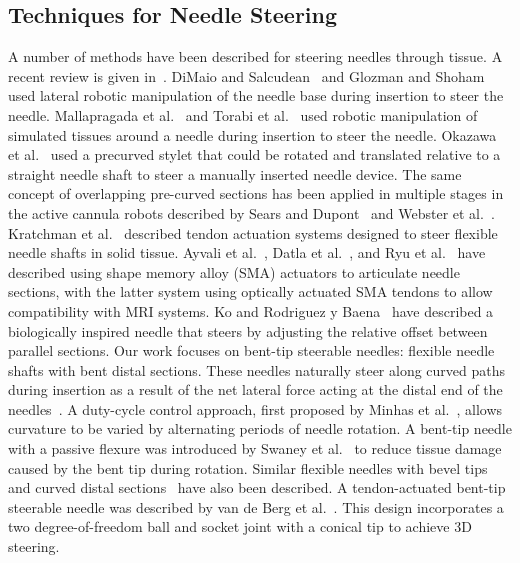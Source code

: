 \subsection{Techniques for Needle Steering}
A number of methods have been described for steering needles through tissue. A recent review is given in~\cite{vandeBerg2014}. DiMaio and Salcudean~\cite{DiMaio2005} and Glozman and Shoham~\cite{Glozman2007} used lateral robotic manipulation of the needle base during insertion to steer the needle. Mallapragada et al.~\cite{Mallapragada2009} and Torabi et al.~\cite{Torabi2009} used robotic manipulation of simulated tissues around a needle during insertion to steer the needle. Okazawa et al.~\cite{Okazawa2005} used a precurved stylet that could be rotated and translated relative to a straight needle shaft to steer a manually inserted needle device. The same concept of overlapping pre-curved sections has been applied in multiple stages in the active cannula robots described by Sears and Dupont~\cite{Sears2006} and Webster et al.~\cite{Webster2009}. Kratchman et al.~\cite{Kratchman2011} described tendon actuation systems designed to steer flexible needle shafts in solid tissue. Ayvali et al.~\cite{Ayvali2012}, Datla et al.~\cite{Datla2014}, and Ryu et al.~\cite{Ryu2014} have described using shape memory alloy (SMA) actuators to articulate needle sections, with the latter system using optically actuated SMA tendons to allow compatibility with MRI systems. Ko and Rodriguez y Baena~\cite{Ko2013} have described a biologically inspired needle that steers by adjusting the relative offset between parallel sections. Our work focuses on bent-tip steerable needles: flexible needle shafts with bent distal sections. These needles naturally steer along curved paths during insertion as a result of the net lateral force acting at the distal end of the needles~\cite{Webster2006}. A duty-cycle control approach, first proposed by Minhas et al.~\cite{Minhas2007}, allows curvature to be varied by alternating periods of needle rotation. A bent-tip needle with a passive flexure was introduced by Swaney et al.~\cite{Swaney2013} to reduce tissue damage caused by the bent tip during rotation. Similar flexible needles with bevel tips~\cite{OLeary2003,Alterovitz2005} and curved distal sections~\cite{Wedlick2009} have also been described. A tendon-actuated bent-tip steerable needle was described by van de Berg et al.~\cite{vandeBerg2015}. This design incorporates a two degree-of-freedom ball and socket joint with a conical tip to achieve 3D steering.

